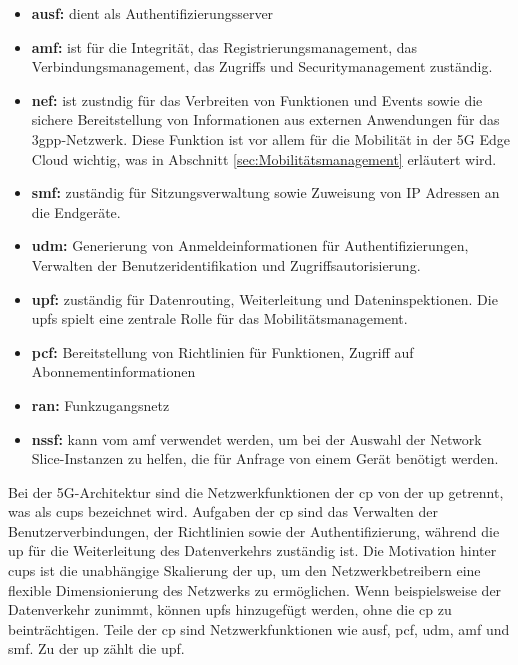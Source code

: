 \documentclass[runningheads]{llncs}
\numberwithin{figure}{section}
\begin{document}
\begin{itemize}
  \item \textbf{\acrfull{ausf}:} dient als Authentifizierungsserver
  \item \textbf{\acrfull{amf}:} ist für die Integrität, das Registrierungsmanagement, das Verbindungsmanagement, das
  Zugriffs und Securitymanagement zuständig.
  \item \textbf{\acrfull{nef}:} ist zustndig für das Verbreiten von Funktionen und Events sowie die 
  sichere Bereitstellung von Informationen aus externen Anwendungen für das \acrshort{3gpp}-Netzwerk. 
  Diese Funktion ist vor allem für die Mobilität
  in der 5G Edge Cloud wichtig, was in Abschnitt \ref{sec:Mobilitätsmanagement} erläutert wird.
  \item \textbf{\acrfull{smf}:} zuständig für Sitzungsverwaltung sowie Zuweisung von IP Adressen an die Endgeräte. 
  \item \textbf{\acrfull{udm}:} Generierung von Anmeldeinformationen für Authentifizierungen, 
  Verwalten der Benutzeridentifikation und Zugriffsautorisierung.
  \item \textbf{\acrfull{upf}:} zuständig für Datenrouting, Weiterleitung und Dateninspektionen. 
  Die \acrshort{upf}s spielt eine zentrale Rolle für das Mobilitätsmanagement.
  \item \textbf{\acrfull{pcf}:} Bereitstellung von Richtlinien für Funktionen, 
  Zugriff auf Abonnementinformationen
  \item \textbf{\acrfull{ran}:} Funkzugangsnetz
  \item \textbf{\acrfull{nssf}:} kann vom \acrshort{amf} verwendet werden, um bei der Auswahl der Network Slice-Instanzen zu 
  helfen, die für Anfrage von einem Gerät benötigt werden.
\end{itemize}
Bei der 5G-Architektur sind die Netzwerkfunktionen der \acrfull{cp} von der \acrfull{up} getrennt, was als \acrfull{cups} bezeichnet wird.
Aufgaben der \acrshort{cp} sind das Verwalten der Benutzerverbindungen, der Richtlinien sowie der Authentifizierung, 
während die \acrshort{up} für die 
Weiterleitung des Datenverkehrs zuständig ist.
Die Motivation hinter \acrshort{cups} ist die unabhängige Skalierung der \acrlong{up}, um den Netzwerkbetreibern eine flexible Dimensionierung
des Netzwerks zu ermöglichen. Wenn beispielsweise der Datenverkehr zunimmt, können \acrlong{upf}s hinzugefügt werden, ohne die \acrlong{cp} zu beinträchtigen.
Teile der \acrshort{cp} sind Netzwerkfunktionen wie \acrshort{ausf}, \acrshort{pcf}, \acrshort{udm}, \acrshort{amf} und \acrshort{smf}. 
Zu der \acrshort{up} zählt die \acrshort{upf}. \cite{5GCoreNetwork2017} \cite{5GCoreNetwork}
\end{document}
